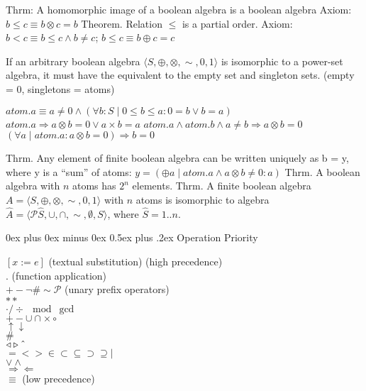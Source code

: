 \documentclass[letterpaper, 8pt]{extarticle}
\makeatletter
\renewcommand{\section}{\@startsection{section}{1}{0mm}%
                                {0ex plus 0ex minus 0ex}%
                                {0.5ex plus .2ex}%
                                {\normalfont\normalsize\bfseries}}
\newcommand{\To}{\Rightarrow}
\makeatother
\begin{document}
\begin{multicols*}{3}
    Thrm: A homomorphic image of a boolean algebra is a boolean algebra
    Axiom: $b \leq c \equiv b \otimes c = b$ Theorem. Relation $\leq$ is a partial order.
    Axiom: $b < c \equiv b \leq c \land b \neq c$; $b \leq c \equiv b \oplus c = c$

    If an arbitrary boolean algebra $\langle S, \oplus, \otimes, \sim, 0, 1\rangle$ is
    isomorphic to a power-set algebra, it must have the equivalent to the empty set and singleton sets.
    (empty = 0, singletons = atoms)

    $atom.a \equiv a \neq 0 \land (\forall b : S \mid 0 \leq b \leq a : 0 = b \lor b = a)$
    $atom.a \To a \otimes b = 0 \lor a \times b = a$
    $atom.a \land atom.b \land a \neq b \To a \otimes b = 0$
    $(\forall a \mid atom.a : a \otimes b = 0) \To b = 0$

    Thrm. Any element of finite boolean algebra can be written uniquely as
    b = y, where y is a ``sum'' of atoms:
    $y = (\oplus a \mid atom.a \land a \otimes b \neq 0 : a)$
    Thrm. A boolean algebra with $n$ atoms has $2^n$ elements.
    Thrm. A finite boolean algebra $A = \langle S, \oplus, \otimes, \sim, 0, 1 \rangle$
    with $n$ atoms is isomorphic to algebra $\hat{A} = \langle \mathcal{P} \hat{S}, \cup, \cap, \sim, \emptyset, S \rangle$, where
    $\hat{S} = 1..n$.




    \section{Operation Priority}
    \begin{multicols}{3}
        $[x := e]$ (textual substitution) (high precedence) \\
        $.$ (function application) \\
        $+ - \neg \# \sim \mathcal{P}$ (unary prefix operators) \\
        $**$ \\
        $\cdot / \div \mod \gcd$ \\
        $+ - \cup \cap \times \circ$ \\
        $\uparrow \downarrow$ \\
        $\#$ \\
        $\triangleleft \triangleright \string^$ \\
        $= < > \in \subset \subseteq \supset \supseteq \mid$ \\
        $\lor \land$ \\
        $\Rightarrow \Leftarrow$ \\
        $\equiv$ (low precedence)
    \end{multicols}


\end{multicols*}
\end{document}
